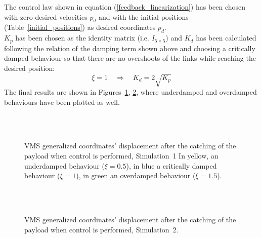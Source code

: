 \documentclass[a4paper,12pt,oneside]{report}
\begin{document}
The control law shown in equation (\ref{feedback_linearization}) has been chosen with zero desired velocities $\dot{p}_d$ and with the initial positions (Table~\ref{initial_positions}) as desired coordinates $p_d$.\\
$K_p$ has been chosen as the identity matrix (i.e. $I_{5\times 5}$) and $K_d$ has been calculated following the relation of the damping term shown above and choosing a critically damped behaviour so that there are no overshoots of the links while reaching the desired position:
\begin{equation}
  \xi=1 \quad \Rightarrow \quad K_d=2\sqrt{K_p}
  \label{critically_damped}
\end{equation}
The final results are shown in Figures~\ref{controlled_motion_1}, \ref{controlled_motion_2}, where underdamped and overdamped behaviours have been plotted as well.
\begin{figure}
  \centering
  \subfloat
  {}\quad
\subfloat
  {} \\
  \subfloat
  {}\quad
  \subfloat
  {
  \label{q1_real}}\\
  \subfloat
  {}
  \caption{VMS generalized coordinates' displacement after the catching of the payload when control is performed, Simulation~1 In yellow, an underdamped behaviour ($\xi=0.5$), in blue a critically damped behaviour ($\xi=1$), in green an overdamped behaviour ($\xi=1.5$).}
  \label{controlled_motion_1}
\end{figure}
\begin{figure}
  \centering
  \subfloat
  {}\quad
\subfloat
  {} \\
  \subfloat
  {}\quad
  \subfloat
  {}\\
  \subfloat
  {}
  \caption{VMS generalized coordinates' displacement after the catching of the payload when control is performed, Simulation~2.}
  \label{controlled_motion_2}
\end{figure}
\newpage
\end{document}
